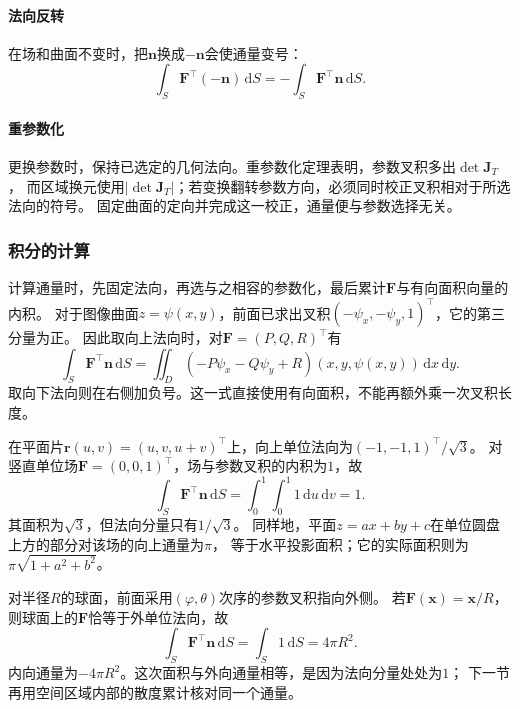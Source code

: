 \paragraph{法向反转}

在场和曲面不变时，把$\bm n$换成$-\bm n$会使通量变号：
\[
 \int_S\bm F^\top(-\bm n)\,\mathrm dS
 =-\int_S\bm F^\top\bm n\,\mathrm dS.
\]

\paragraph{重参数化}

更换参数时，保持已选定的几何法向。重参数化定理表明，参数叉积多出$\det\bm J_T$，
而区域换元使用$|\det\bm J_T|$；若变换翻转参数方向，必须同时校正叉积相对于所选法向的符号。
固定曲面的定向并完成这一校正，通量便与参数选择无关。

\subsubsection{积分的计算}

计算通量时，先固定法向，再选与之相容的参数化，最后累计$\bm F$与有向面积向量的内积。
对于图像曲面$z=\psi(x,y)$，前面已求出叉积$(-\psi_x,-\psi_y,1)^\top$，它的第三分量为正。
因此取向上法向时，对$\bm F=(P,Q,R)^\top$有
\[
 \int_S\bm F^\top\bm n\,\mathrm dS
 =\iint_D(-P\psi_x-Q\psi_y+R)(x,y,\psi(x,y))\,\mathrm dx\,\mathrm dy.
\]
取向下法向则在右侧加负号。这一式直接使用有向面积，不能再额外乘一次叉积长度。

在平面片$\bm r(u,v)=(u,v,u+v)^\top$上，向上单位法向为$(-1,-1,1)^\top/\sqrt3$。
对竖直单位场$\bm F=(0,0,1)^\top$，场与参数叉积的内积为$1$，故
\[
 \int_S\bm F^\top\bm n\,\mathrm dS
 =\int_0^1\int_0^1 1\,\mathrm du\,\mathrm dv=1.
\]
其面积为$\sqrt3$，但法向分量只有$1/\sqrt3$。
同样地，平面$z=ax+by+c$在单位圆盘上方的部分对该场的向上通量为$\pi$，
等于水平投影面积；它的实际面积则为$\pi\sqrt{1+a^2+b^2}$。

对半径$R$的球面，前面采用$(\varphi,\theta)$次序的参数叉积指向外侧。
若$\bm F(\bm x)=\bm x/R$，则球面上的$\bm F$恰等于外单位法向，故
\[
 \int_S\bm F^\top\bm n\,\mathrm dS
 =\int_S1\,\mathrm dS=4\pi R^2.
\]
内向通量为$-4\pi R^2$。这次面积与外向通量相等，是因为法向分量处处为$1$；
下一节再用空间区域内部的散度累计核对同一个通量。

\FloatBarrier
